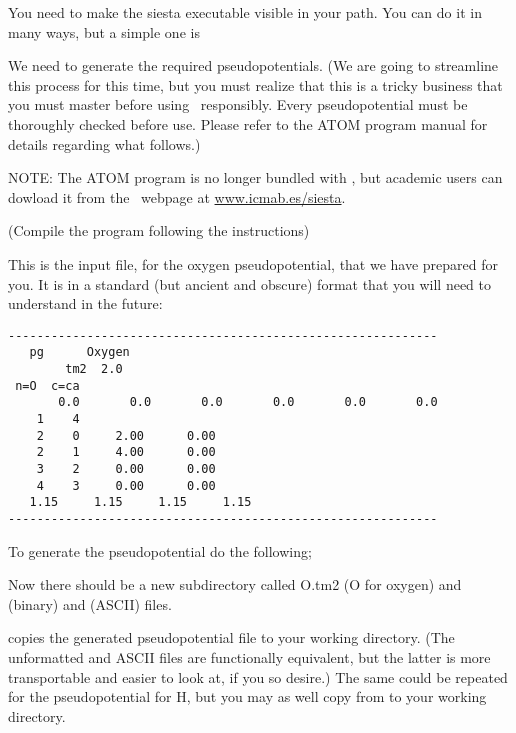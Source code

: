 You need to make the siesta executable visible in your path. 
You can do it in many ways, but a simple one is


\noindent
We need to generate the required pseudopotentials.
(We are going to streamline this process for this time, but
you must realize that this is a tricky business that you
must master before using \siesta\ responsibly. Every
pseudopotential must be thoroughly checked before use. Please refer to
the \textsc{ATOM} program manual for details regarding what follows.)

NOTE: The \textsc{ATOM} program is no longer bundled with \siesta,
but academic users can dowload it from the \siesta\ webpage at
\url{www.icmab.es/siesta}.


(Compile the program following the instructions)



\noindent
This is the input file, for the oxygen pseudopotential,
that we have prepared for you.
It is in a standard (but ancient and obscure) format that
you will need to understand in the future:
\begin{verbatim}
------------------------------------------------------------
   pg      Oxygen
        tm2  2.0
 n=O  c=ca
       0.0       0.0       0.0       0.0       0.0       0.0
    1    4
    2    0     2.00      0.00
    2    1     4.00      0.00
    3    2     0.00      0.00
    4    3     0.00      0.00
   1.15     1.15     1.15     1.15
------------------------------------------------------------
\end{verbatim}

To generate the pseudopotential do the following;


\noindent
Now there should be a new subdirectory called O.tm2 (O for oxygen)
and  (binary) and  (ASCII) files.


\noindent
copies the generated pseudopotential file to your working directory.
(The unformatted and ASCII files are functionally equivalent, but
the latter is more transportable and easier to look at, if you so
desire.) The same could be repeated for the pseudopotential for H,
but you may as well copy  from 
to your  working directory.

